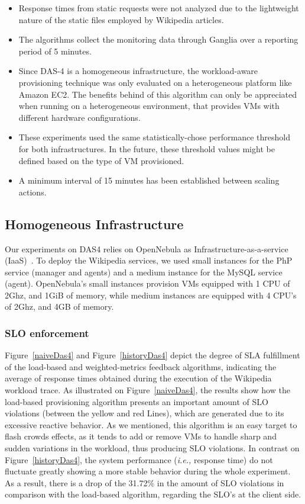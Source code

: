 \begin{itemize}
\item  Response times from static requests were not analyzed due to the lightweight nature of the static files employed by Wikipedia articles. 

\item The algorithms collect the monitoring data through Ganglia over a reporting period of 5 minutes.

\item Since DAS-4 is a homogeneous infrastructure, the workload-aware provisioning technique was only evaluated on a heterogeneous platform like Amazon EC2. The benefits behind of this algorithm can only be appreciated when running on a heterogeneous environment, that provides VMs with different hardware configurations. 

\item These experiments used the same statistically-chose performance threshold for both infrastructures. In the future, these threshold values might be defined based on the type of VM provisioned. 

\item A minimum interval of 15 minutes has been established between scaling actions.
\end{itemize}
\subsection{Homogeneous Infrastructure}

Our experiments on DAS4 relies on OpenNebula as Infrastructure-as-a-service (IaaS)~\cite{sotomayor_virtual_2009}. To deploy the Wikipedia services, we used small instances for the PhP service (manager and agents) and a medium instance for the MySQL service (agent). OpenNebula's small instances provision VMs equipped with 1 CPU of 2Ghz, and 1GiB of memory, while medium instances are equipped with 4 CPU's of 2Ghz, and 4GB of memory.

\subsubsection{SLO enforcement}
Figure~\ref{naiveDas4} and Figure~\ref{historyDas4} depict the degree of SLA fulfillment of the load-based and weighted-metrics feedback algorithms, indicating the average of response times obtained during the execution of the Wikipedia workload trace. As illustrated on Figure~\ref{naiveDas4}, the results show how the load-based provisioning algorithm presents an important amount of SLO violations (between the yellow and red Lines), which are generated due to its excessive reactive behavior. As we mentioned, this algorithm is an easy target to flash crowds effects, as it tends to add or remove VMs to handle sharp and sudden variations in the workload, thus producing SLO violations. In contrast on Figure~\ref{historyDas4}, the system performance (\emph{i.e.,} response time) do not fluctuate greatly showing a more stable behavior during the whole experiment. As a result, there is a drop of the 31.72\% in the amount of SLO violations in comparison with the load-based algorithm, regarding the SLO's at the client side. 


